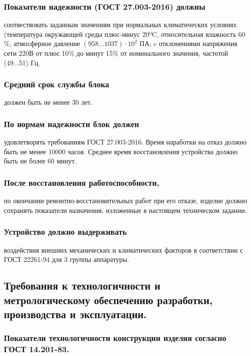 \documentclass[a4paper]{bsuir-tor}
\begin{document}
\subsubsection{Показатели надежности (ГОСТ 27.003-2016) должны}
соотвествовать заданным значениям при нормальных климатических
условиях (температура окружающей среды плюс-минус 20ºC, относительная
влажность 60 \%, атмосферное давление $(958...1037) \cdot  10^2$ ПА;
c отклонениями напряжения сети 220В от плюс 10\% до минут 15\%
от номинального значения, частотой (49...51) Гц.

\subsubsection{Средний срок службы блока }
 должен быть не менее 30 лет.

 \subsubsection{ По нормам надежности блок должен }
 удовлетворять требованиям ГОСТ 27.003-2016. Время наработки на отказ
 должно быть не менее 10000 часов. Среднее время восстановления
 устройства должно быть не более 60 минут.
 
 \subsubsection{После восстановления работоспособности, }
 по окончании ремонтно-восстановительных работ при его отказе, изделие
 должно сохранять показатели назначения, изложенные в настоящем
 техническом задании.

 \subsubsection{Устройство должно выдерживать}
 воздействия внешних
 механических и климатических факторов в соответствии с ГОСТ 22261-94
 для 3 группы аппаратуры.

 \subsection{Требования к технологичности и
   метрологическому обеспечению разработки,
   производства и эксплуатации.}

 \subsubsection{Показатели технологичности конструкции изделия согласно ГОСТ 14.201-83.}
 
\end{document}
